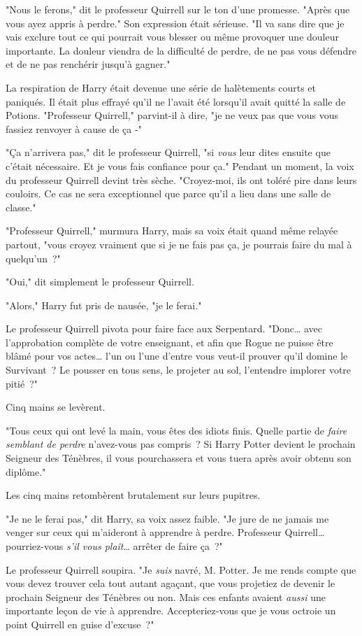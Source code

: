 "Nous le ferons," dit le professeur Quirrell sur le ton d'une promesse. "Après que vous ayez appris à perdre." Son expression était sérieuse. "Il va sans dire que je vais exclure tout ce qui pourrait vous blesser ou même provoquer une douleur importante. La douleur viendra de la difficulté de perdre, de ne pas vous défendre et de ne pas renchérir jusqu'à gagner."

La respiration de Harry était devenue une série de halètements courts et paniqués. Il était plus effrayé qu'il ne l'avait été lorsqu'il avait quitté la salle de Potions. "Professeur Quirrell," parvint-il à dire, "je ne veux pas que vous vous fassiez renvoyer à cause de ça -"

"Ça n'arrivera pas," dit le professeur Quirrell, "si \emph{vous} leur dites ensuite que c'était nécessaire. Et je vous fais confiance pour ça." Pendant un moment, la voix du professeur Quirrell devint très sèche. "Croyez-moi, ils ont toléré pire dans leurs couloirs. Ce cas ne sera exceptionnel que parce qu'il a lieu dans une salle de classe."

"Professeur Quirrell," murmura Harry, mais sa voix était quand même relayée partout, "vous croyez vraiment que si je ne fais pas ça, je pourrais faire du mal à quelqu'un~?"

"Oui," dit simplement le professeur Quirrell.

"Alors," Harry fut pris de nausée, "je le ferai."

Le professeur Quirrell pivota pour faire face aux Serpentard. "Donc… avec l'approbation complète de votre enseignant, et afin que Rogue ne puisse être blâmé pour vos actes… l'un ou l'une d'entre vous veut-il prouver qu'il domine le Survivant~? Le pousser en tous sens, le projeter au sol, l'entendre implorer votre pitié~?"

Cinq mains se levèrent.

"Tous ceux qui ont levé la main, vous êtes des idiots finis. Quelle partie de \emph{faire semblant de perdre} n'avez-vous pas compris~? Si Harry Potter devient le prochain Seigneur des Ténèbres, il vous pourchassera et vous tuera après avoir obtenu son diplôme."

Les cinq mains retombèrent brutalement sur leurs pupitres.

"Je ne le ferai pas," dit Harry, sa voix assez faible. "Je jure de ne jamais me venger sur ceux qui m'aideront à apprendre à perdre. Professeur Quirrell… pourriez-vous \emph{s'il vous plaît}… arrêter de faire ça~?"

Le professeur Quirrell soupira. "Je \emph{suis} navré, M. Potter. Je me rends compte que vous devez trouver cela tout autant agaçant, que vous projetiez de devenir le prochain Seigneur des Ténèbres ou non. Mais ces enfants avaient \emph{aussi} une importante leçon de vie à apprendre. Accepteriez-vous que je vous octroie un point Quirrell en guise d'excuse~?"

